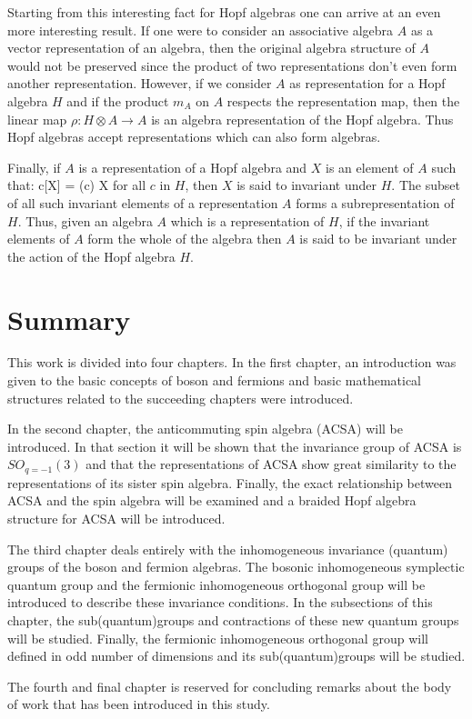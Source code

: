 Starting from this interesting fact for Hopf algebras one can arrive at an even more
interesting result. If one were to consider an associative algebra $A$ as a vector representation
of an algebra, then the original algebra structure of $A$ would not be preserved since the
product of two representations don't even form another representation. However, if we consider $A$
as representation for a Hopf algebra $H$ and if the product $m_A$ on $A$ respects the representation map,
then the linear map $\rho: H \otimes A \rightarrow A$ is an algebra representation of the Hopf algebra.
Thus Hopf algebras accept representations which can also form algebras.

Finally, if $A$ is a representation of a Hopf algebra and $X$ is an element of $A$ such that:
\beq
c[X] = \epsilon(c) X
\eeq
for all $c$ in $H$, then $X$ is said to invariant under
$H$. The subset of all such invariant elements of a representation $A$ forms a subrepresentation of $H$.
Thus, given an algebra $A$ which is a representation of $H$, if the invariant elements of $A$ form the
whole of the algebra then $A$ is said to be invariant under the action of the Hopf algebra $H$.
\section{Summary}

This work is divided into four chapters. In the first chapter, an introduction was given to
the basic concepts of boson and fermions and basic mathematical structures related to the
succeeding chapters were introduced.

In the second chapter, the anticommuting spin algebra (ACSA) will be introduced. In that section
it will be shown that the invariance group of ACSA is $SO_{q = -1}(3)$ and that the representations
of ACSA show great similarity to the representations of its sister spin algebra. Finally, the exact
relationship between ACSA and the spin algebra will be examined and a braided Hopf algebra structure
for ACSA will be introduced.

The third chapter deals entirely with the inhomogeneous invariance (quantum) groups of the
boson and fermion algebras. The bosonic inhomogeneous symplectic quantum group and the
fermionic inhomogeneous orthogonal group will be introduced to describe these invariance
conditions. In the subsections of this chapter, the sub(quantum)groups and contractions of
these new quantum groups will be studied. Finally, the fermionic inhomogeneous orthogonal
group will defined in odd number of dimensions and its sub(quantum)groups will be studied.

The fourth and final chapter is reserved for concluding remarks about the body of work that
has been introduced in this study.
